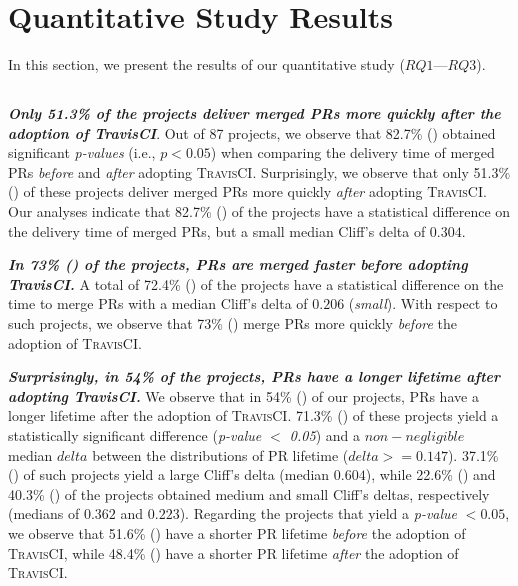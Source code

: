 \section{\textbf{Quantitative Study Results}}
\label{sec_quantitative_study_results}

In this section, we present the results of our quantitative study ($RQ1$---$RQ3$).

\subsection*{\textbf{\RQone}}
\label{RQ1_results}

\textit{\textbf{Only 51.3\% of the projects deliver merged PRs more quickly \textit{after} the adoption of TravisCI}}.  Out of 87 projects, we observe that
82.7\% () obtained significant \textit{p-values} (i.e., $p<0.05$) when comparing the delivery time of merged PRs {\em before} and {\em after} adopting \textsc{TravisCI}. Surprisingly, we observe that only 51.3\% () of these projects deliver merged PRs more quickly {\em after} adopting \textsc{TravisCI}. 
Our analyses indicate that 82.7\% () of the projects have a statistical difference on the
delivery time of merged PRs, but a small median Cliff's delta of $0.304$.                                     

\textit{\textbf{In 73\% () of the projects, PRs are merged faster \textit{before} adopting TravisCI.}} A total of 72.4\% () of the projects have a statistical difference on the time to merge PRs with a median Cliff's delta of $0.206$ (\textit{small}). With respect to such
projects, we observe that 73\% () merge PRs more quickly \textit{before} the adoption of \textsc{TravisCI}. 

\textit{\textbf{Surprisingly, in 54\% of the projects, PRs have a longer lifetime after adopting TravisCI.}}
We observe that in 54\% () of our projects, PRs have a longer lifetime after the adoption of \textsc{TravisCI}. 71.3\% () of these projects yield a statistically significant difference (\textit{p-value $<$ 0.05}) and a
$non-negligible$ median $delta$ between the distributions of PR lifetime
($delta>=0.147$). 37.1\% () of such projects yield a large Cliff's delta (median $0.604$), while 22.6\% () and 40.3\%
() of the projects obtained medium and small Cliff's deltas, respectively (medians of $0.362$ and $0.223$).
Regarding the projects that yield a \textit{p-value} $< 0.05$, we observe that 51.6\% () have a shorter PR lifetime \textit{before} the adoption of \textsc{TravisCI}, while 48.4\% () have a shorter PR lifetime \textit{after} the adoption of \textsc{TravisCI}. 

